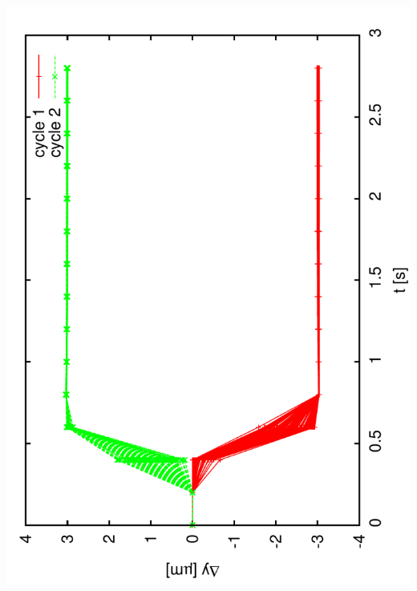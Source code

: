 \documentclass[a4paper,11pt]{book}
\begin{document}
 \includegraphics[angle=-90,scale=0.16]{image04.pdf}
\end{document}
